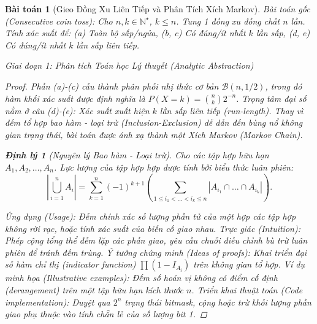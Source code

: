\documentclass{article}
\newtheorem{baitoan}{Bài toán}
\newtheorem{dinhly}{Định lý}
\begin{document}

\newpage

\begin{baitoan}[Gieo Đồng Xu Liên Tiếp và Phân Tích Xích Markov]
 \emph{Bài toán gốc (Consecutive coin toss):} 
 Cho $n,k\in\mathbb{N}^\star$, $k\le n$. Tung 1 đồng xu đồng chất $n$ lần. Tính xác suất để: (a) Toàn bộ sấp/ngửa, (b, c) Có đúng/ít nhất $k$ lần sấp, (d, e) Có đúng/ít nhất $k$ lần sấp liên tiếp.

\vspace{0.5em}\noindent\emph{Giai đoạn 1: Phân tích Toán học Lý thuyết (Analytic Abstraction)}
 
 \begin{proof}
 Phần (a)-(c) cấu thành phân phối nhị thức cơ bản $\mathcal{B}(n, 1/2)$, trong đó hàm khối xác suất được định nghĩa là $P(X=k) = \binom{n}{k}2^{-n}$. 
 Trọng tâm đại số nằm ở câu (d)-(e): Xác suất xuất hiện $k$ lần sấp liên tiếp (run-length). Thay vì đếm tổ hợp bao hàm - loại trừ (Inclusion-Exclusion) dễ dẫn đến bùng nổ không gian trạng thái, bài toán được ánh xạ thành một Xích Markov (Markov Chain).

\begin{dinhly}[Nguyên lý Bao hàm - Loại trừ]
Cho các tập hợp hữu hạn $A_1, A_2, \dots, A_n$. Lực lượng của tập hợp hợp được tính bởi biểu thức luân phiên:
$$ \left| \bigcup_{i=1}^n A_i \right| = \sum_{k=1}^n (-1)^{k+1} \left( \sum_{1 \le i_1 < \dots < i_k \le n} |A_{i_1} \cap \dots \cap A_{i_k}| \right). $$
\end{dinhly}
\emph{Ứng dụng (Usage):} Đếm chính xác số lượng phần tử của một hợp các tập hợp không rời rạc, hoặc tính xác suất của biến cố giao nhau.
\emph{Trực giác (Intuition):} Phép cộng tổng thể đếm lặp các phần giao, yêu cầu chuỗi điều chỉnh bù trừ luân phiên để tránh đếm trùng.
\emph{Ý tưởng chứng minh (Ideas of proofs):} Khai triển đại số hàm chỉ thị (indicator function) $\prod (1 - I_{A_i})$ trên không gian tổ hợp.
\emph{Ví dụ minh họa (Illustrative examples):} Đếm số hoán vị không có điểm cố định (derangement) trên một tập hữu hạn kích thước $n$.
\emph{Triển khai thuật toán (Code implementation):} Duyệt qua $2^n$ trạng thái bitmask, cộng hoặc trừ khối lượng phần giao phụ thuộc vào tính chẵn lẻ của số lượng bit 1.


\end{proof}
\end{baitoan}
\end{document}
